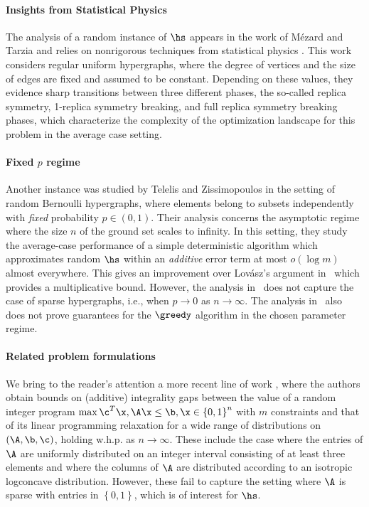 \paragraph*{\textbf{Insights from Statistical Physics}}
The analysis of a random instance of $\hs$ appears in the work of M\'ezard and Tarzia and relies on nonrigorous techniques from statistical physics \cite{mezard2007statistical}. This work considers regular uniform hypergraphs, where the degree of vertices and the size of edges are fixed and assumed to be constant. Depending on these values, they evidence sharp transitions between three different phases, the so-called replica symmetry, 1-replica symmetry breaking, and full replica symmetry breaking phases, which characterize the complexity of the optimization landscape for this problem in the average case setting. 
%
\paragraph*{\textbf{Fixed $p$ regime}}
Another instance was studied by Telelis and Zissimopoulos \cite{telelis2005absolute} in the setting of random Bernoulli hypergraphs, where elements belong to subsets independently with \emph{fixed} probability $p\in(0,1)$. Their analysis concerns the asymptotic regime where the size $n$ of the ground set scales to infinity. In this setting, they study the average-case performance of a simple deterministic algorithm which approximates random $\hs$ within an \textit{additive} error term at most $o(\log m)$ almost everywhere. This gives an improvement over Lovász's argument in~\cite{lovasz1975ratio} which provides a multiplicative bound. 
However, the analysis in~\cite{telelis2005absolute} does not capture the case of sparse hypergraphs, i.e., when $p \to 0$ as $n \to \infty$. The analysis in~\cite{telelis2005absolute} also does not prove guarantees for the $\greedy$ algorithm in the chosen parameter regime. 
\paragraph*{\textbf{Related problem formulations}}
We bring to the reader’s attention a more recent line of work \cite{borst2022gaussian, borst2022integrality}, where the authors obtain bounds on (additive) integrality gaps between the value of a random integer program $\max \c^T \x, \A\x \leq \b, \x \in \left\{0,1\right\}^n$ with $m$ constraints and that of its linear programming relaxation for a wide range of distributions on $(\A,\b,\c)$, holding w.h.p. as $n\rightarrow \infty$. These include the case where the entries of $\A$ are uniformly distributed on an integer interval consisting of at least three elements and where the columns of $\A$ are distributed according to an isotropic logconcave distribution. 
However, these fail to capture the setting where $\A$ is sparse with entries in $\left\{0,1\right\}$, which is of interest for $\hs$.